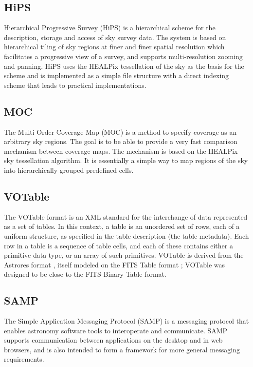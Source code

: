 \documentclass[11pt,a4paper]{ivoa}
\begin{document}
\subsection{HiPS}

Hierarchical Progressive Survey (HiPS) \citep{2017ivoa.spec.0519F} is a hierarchical scheme for the description, storage and 
access of sky survey data. The system is based on hierarchical tiling of sky regions at 
finer and finer spatial resolution which facilitates a progressive view of a survey, and 
supports multi-resolution zooming and panning. HiPS uses the HEALPix tessellation of the 
sky as the basis for the scheme and is implemented as a simple file structure with a direct 
indexing scheme that leads to practical implementations. 

\subsection{MOC}

The Multi-Order Coverage Map (MOC) \citep{2019ivoa.spec.1007F} is a method to specify coverage as an arbitrary sky regions. 
The goal is to be able to provide a very fast comparison mechanism between coverage maps. 
The mechanism is based on the HEALPix sky tessellation algorithm. It is essentially a 
simple way to map regions of the sky into hierarchically grouped predefined cells. 

\subsection{VOTable} 

The VOTable \citep{2019ivoa.spec.1021O} format is an XML standard for the interchange of data represented as a set of tables. 
In this context, a table is an unordered set of rows, each of a uniform structure, as specified 
in the table description (the table metadata). Each row in a table is a sequence of table cells, 
and each of these contains either a primitive data type, or an array of such primitives. VOTable 
is derived from the Astrores format \citep{astrores}, itself modeled on the FITS Table format 
\citep{std:FITS}; VOTable was designed to be close to the FITS Binary Table format. 

\subsection{SAMP}

The Simple Application Messaging Protocol (SAMP) \citep{2009ivoa.spec.0421B} is a messaging protocol that enables astronomy 
software tools to interoperate and communicate. SAMP supports communication between 
applications on the desktop and in web browsers, and is also intended to form a framework 
for more general messaging requirements. 
\end{document}
